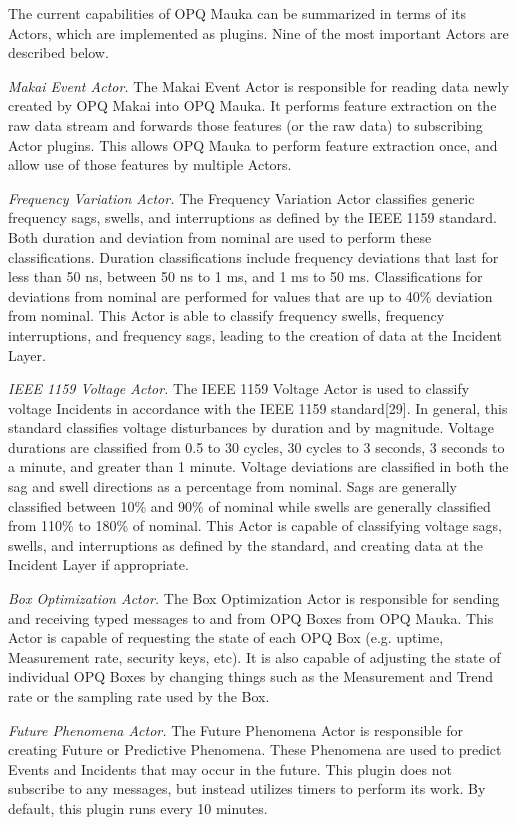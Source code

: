 The current capabilities of OPQ Mauka can be summarized in terms of its Actors, which are implemented as plugins. Nine of the most important Actors are described below.

{\em Makai Event Actor.} The Makai Event Actor is responsible for reading data newly created by OPQ Makai into OPQ Mauka. It performs feature extraction on the raw data stream and forwards those features (or the raw data) to subscribing Actor plugins. This allows OPQ Mauka to perform feature extraction once, and allow use of those features by multiple Actors.

{\em Frequency Variation Actor.} The Frequency Variation Actor classifies generic frequency sags, swells, and interruptions as defined by the IEEE 1159 standard. Both duration and deviation from nominal are used to perform these classifications. Duration classifications include frequency deviations that last for less than 50 ns, between 50 ns to 1 ms, and 1 ms to 50 ms. Classifications for deviations from nominal are performed for values that are up to 40\% deviation from nominal. This Actor is able to classify frequency swells, frequency interruptions, and frequency sags, leading to the creation of data at the Incident Layer.

{\em IEEE 1159 Voltage Actor.} The IEEE 1159 Voltage Actor is used to classify voltage Incidents in accordance with the IEEE 1159 standard[29]. In general, this standard classifies voltage disturbances by duration and by magnitude. Voltage durations are classified from 0.5 to 30 cycles, 30 cycles to 3 seconds, 3 seconds to a minute, and greater than 1 minute. Voltage deviations are classified in both the sag and swell directions as a percentage from nominal. Sags are generally classified between 10\% and 90\% of nominal while swells are generally classified from 110\% to 180\% of nominal. This Actor is capable of classifying voltage sags, swells, and interruptions as defined by the standard, and creating data at the Incident Layer if appropriate.

{\em Box Optimization Actor.} The Box Optimization Actor is responsible for sending and receiving typed messages to and from OPQ Boxes from OPQ Mauka. This Actor is capable of requesting the state of each OPQ Box (e.g. uptime, Measurement rate, security keys, etc). It is also capable of adjusting the state of individual OPQ Boxes by changing things such as the Measurement and Trend rate or the sampling rate used by the Box.

{\em Future Phenomena Actor.} The Future Phenomena Actor is responsible for creating Future or Predictive Phenomena. These Phenomena are used to predict Events and Incidents that may occur in the future. This plugin does not subscribe to any messages, but instead utilizes timers to perform its work. By default, this plugin runs every 10 minutes.

